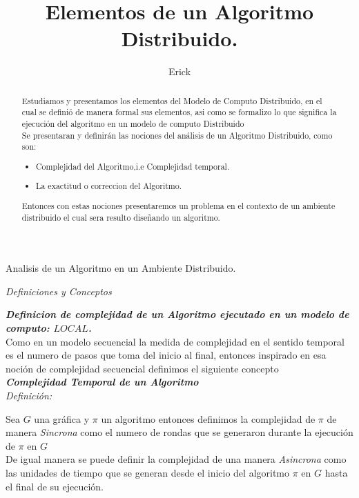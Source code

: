 \documentclass[11pt]{article}
\author{Erick}
\title{Elementos de un Algoritmo Distribuido.}
\begin{document}
\begin{titlepage}
    \begin{Large}
        Analisis de un Algoritmo en un Ambiente Distribuido.
    \end{Large}
\begin{abstract}
Estudiamos y presentamos los elementos del Modelo de Computo
Distribuido, en el cual se  definió de manera formal sus elementos, asi como se formalizo lo que significa la ejecución del algoritmo en un modelo de computo Distribuido
\\
Se presentaran y definirán las nociones del análisis de un Algoritmo Distribuido, como son:
\begin{itemize}

 \item Complejidad del Algoritmo,i.e Complejidad temporal.
 \item La exactitud o correccion del Algoritmo.
\end{itemize}

Entonces con estas nociones presentaremos un problema en el contexto de un ambiente distribuido
el cual sera resulto diseñando un algoritmo.
\end{abstract}
\end{titlepage}
\begin{center}
    \begin{Large}
    \textit{Definiciones y Conceptos}
    \end{Large}
\end{center}

\textbf{\emph{Definicion de complejidad de un Algoritmo ejecutado en un modelo de computo: $ LOCAL $.}}\\


Como en un modelo secuencial la medida de complejidad en el sentido temporal es el numero de pasos que toma del inicio al final, entonces inspirado en esa noción de complejidad secuencial definimos el siguiente concepto \\

\textbf{\emph{Complejidad Temporal de un Algoritmo}}\\

\emph{Definición:}

Sea $ G $ una gráfica y $ \pi $ un algoritmo entonces definimos la complejidad de $ \pi $ de manera \emph{Sincrona} como
el numero de rondas que se generaron durante la ejecución de $ \pi $ en $ G $ \\

De igual manera se puede definir la complejidad de una manera \emph{Asincrona} como las unidades de tiempo que se generan desde el inicio del algoritmo $ \pi $ en $ G $ hasta el final de su ejecución.\\
\end{document}
